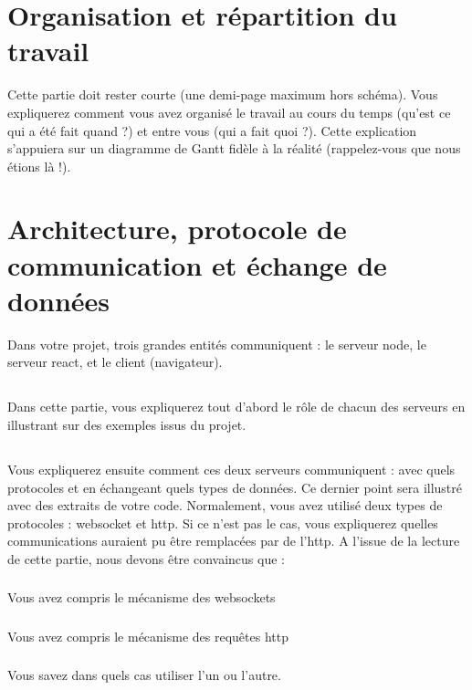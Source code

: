 \documentclass[a4paper]{article}
\begin{document}
\section{Organisation et répartition du travail}
 Cette partie doit rester courte (une demi-page maximum hors schéma). Vous expliquerez comment vous avez organisé le travail au cours du temps (qu’est ce qui a été fait quand ?) et entre vous (qui a fait quoi ?). Cette explication s’appuiera sur un diagramme de Gantt fidèle à la réalité (rappelez-vous que nous étions là !). 



\section{Architecture, protocole de communication et échange de données}

Dans votre projet, trois grandes entités communiquent : le serveur node, 
le serveur react, et le client (navigateur). 
\subsection{} Dans cette partie, vous expliquerez tout d’abord le rôle de chacun des serveurs en 
illustrant sur des exemples issus du projet. 
\subsection{} Vous expliquerez ensuite comment ces deux serveurs communiquent : avec quels 
protocoles et en échangeant quels types de données. Ce dernier point sera illustré 
avec des extraits de votre code. Normalement, vous avez utilisé deux types de 
protocoles : websocket et http. Si ce n’est pas le cas, vous expliquerez quelles 
communications auraient pu être remplacées par de l’http. A l’issue de la lecture de 
cette partie, nous devons être convaincus que :
\subsubsection{} Vous avez compris le mécanisme des websockets
\subsubsection{} Vous avez compris le mécanisme des requêtes http
\subsubsection{} Vous savez dans quels cas utiliser l’un ou l’autre.
\end{document}

